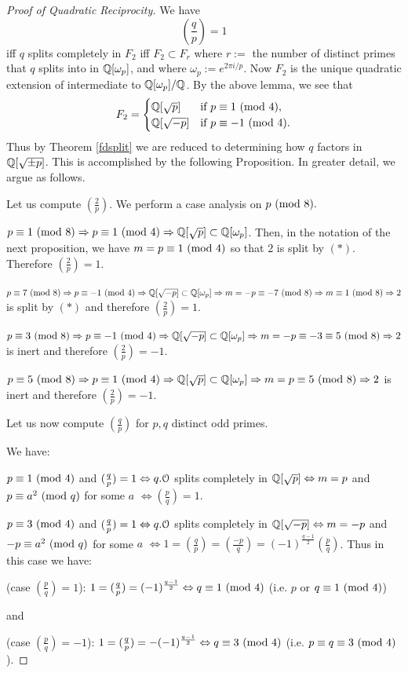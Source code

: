 \documentclass[10pt,a4paper]{amsart}
\begin{document}
\begin{proof}[Proof of Quadratic Reciprocity]
We have \[\left( \frac{q}{p} \right) = 1\] iff $q$ splits completely in $F_2$
iff $F_2 \subset F_r$ where $r:= $ the number of distinct primes that $q$
splits into in $\mathbb{Q}[\omega_p]$, and where $\omega_p := e^{2\pi i /p}$. Now
$F_2$ is the unique quadratic extension of \Q{} intermediate to
$\mathbb{Q}[\omega_p]/\mathbb{Q}$. By the above lemma, we see that
\[ F_2 =
\begin{cases}
  \mathbb{Q}[\sqrt{p}] & \text{if } p \equiv 1 \text{ } (\mathrm{mod}\text{ } 4),\\
  \mathbb{Q}[\sqrt{-p}] & \text{if } p \equiv -1 \text{ } (\mathrm{mod}\text{ } 4).
\end{cases} \] Thus by Theorem \ref{fdsplit} we are reduced to determining how
$q$ factors in $\mathbb{Q}[\sqrt{\pm p}]$. This is accomplished by the following
Proposition. In greater detail, we argue as follows.

Let us compute $(\frac{2}{p})$. We perform a case analysis on $p\text{ } (\mathrm{mod}\text{ } 8).$

$p\equiv 1 \text{ } (\mathrm{mod}\text{ } 8) \Rightarrow p \equiv 1 \text{ } (\mathrm{mod}\text{ } 4) \Rightarrow \mathbb{Q}[\sqrt{p}]
\subset \mathbb{Q}[\omega_p]$. Then, in the notation of the next proposition, we have
$m = p \equiv 1 \text{ } (\mathrm{mod}\text{ } 4)$ so that $2$ is split by $(*)$. Therefore
$(\frac{2}{p}) = 1$.

$p\equiv 7 \text{ } (\mathrm{mod}\text{ } 8) \Rightarrow p \equiv -1 \text{ } (\mathrm{mod}\text{ } 4) \Rightarrow \mathbb{Q}[\sqrt{-p}]
\subset \mathbb{Q}[\omega_p] \Rightarrow m = -p \equiv -7 \text{ } (\mathrm{mod}\text{ } 8) \Rightarrow m \equiv
1 \text{ } (\mathrm{mod}\text{ } 8) \Rightarrow 2$ is split by $(*)$ and therefore $(\frac{2}{p}) = 1$.

$p\equiv 3 \text{ } (\mathrm{mod}\text{ } 8) \Rightarrow p \equiv -1 \text{ } (\mathrm{mod}\text{ } 4) \Rightarrow \mathbb{Q}[\sqrt{-p}]
\subset \mathbb{Q}[\omega_p] \Rightarrow m = -p \equiv -3 \equiv 5 \text{ } (\mathrm{mod}\text{ } 8) \Rightarrow
2$ is inert and therefore $(\frac{2}{p}) = -1$.

$p\equiv 5 \text{ } (\mathrm{mod}\text{ } 8) \Rightarrow p \equiv 1 \text{ } (\mathrm{mod}\text{ } 4) \Rightarrow \mathbb{Q}[\sqrt{p}]
\subset \mathbb{Q}[\omega_p] \Rightarrow m = p \equiv 5 \text{ } (\mathrm{mod}\text{ } 8) \Rightarrow 2$ is
inert and therefore $(\frac{2}{p}) = -1$.

Let us now compute $(\frac{q}{p})$ for $p,q$ distinct odd primes.

We have:

$p\equiv 1 \text{ } (\mathrm{mod}\text{ } 4)$ and $(\frac{q}{p}) = 1 \Leftrightarrow q.\mathcal{O}$ splits
completely in $\mathbb{Q}[\sqrt{p}] \Leftrightarrow m = p $ and $p \equiv a^2 \text{ } (\mathrm{mod}\text{ } q)$
for some $a$ $\Leftrightarrow (\frac{p}{q}) = 1$.

$p\equiv 3 \text{ } (\mathrm{mod}\text{ } 4)$ and $(\frac{q}{p}) = 1 \Leftrightarrow q.\mathcal{O}$ splits
completely in $\mathbb{Q}[\sqrt{-p}] \Leftrightarrow m = -p $ and $-p \equiv a^2
\text{ } (\mathrm{mod}\text{ } q)$ for some $a$ $\Leftrightarrow 1 = (\frac{q}{p}) = (\frac{-p}{q}) =
(-1)^{\frac{q-1}{2}}(\frac{p}{q})$. Thus in this case we have:

(case $(\frac{p}{q}) = 1$): $1 = (\frac{q}{p}) = (-1)^{\frac{q-1}{2}}
\Leftrightarrow q \equiv 1 \text{ } (\mathrm{mod}\text{ } 4)$ (i.e. $p$ or $q\equiv 1 \text{ } (\mathrm{mod}\text{ } 4)$)

and

(case $(\frac{p}{q}) = -1$): $1 = (\frac{q}{p}) = -(-1)^{\frac{q-1}{2}}
\Leftrightarrow q \equiv 3 \text{ } (\mathrm{mod}\text{ } 4)$ (i.e. $p\equiv q\equiv 3 \text{ } (\mathrm{mod}\text{ } 4)$).
\end{proof}
\end{document}
